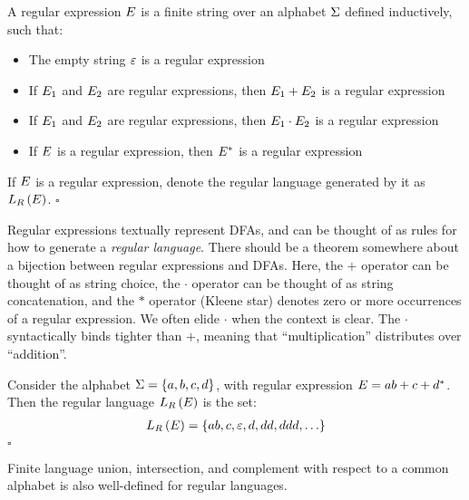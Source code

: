 \begin{definition}
  A regular expression \(E\)
  is a finite string over an alphabet \(\Sigma\)
  defined inductively, such that:
  \begin{itemize}
    \item
      The empty string \(\varepsilon\) is a regular expression

    \item
      If \(E_1\) and \(E_2\) are regular expressions,
      then \(E_1 + E_2\) is a regular expression

    \item
      If \(E_1\) and \(E_2\) are regular expressions,
      then \(E_1 \cdot E_2\) is a regular expression

    \item
      If \(E\) is a regular expression,
      then \(E^\ast\) is a regular expression
  \end{itemize}
  If \(E\) is a regular expression, denote the 
  regular language generated by it as \(L_{R}\left(E\right)\).
  \hfill\(\square\)
\end{definition}

Regular expressions textually represent DFAs, and can be thought of
as rules for how to generate a \textit{regular language}.
There should be a theorem somewhere about a bijection between
regular expressions and DFAs.
Here, the \(+\) operator can be thought of as string choice,
the \(\cdot\) operator can be thought of as string concatenation,
and the \(\ast\) operator (Kleene star) denotes zero or more occurrences
of a regular expression.
We often elide \(\cdot\) when the context is clear.
The \(\cdot\) syntactically
binds tighter than \(+\), meaning that ``multiplication''
distributes over ``addition''.

\begin{example}
  Consider the alphabet \(\Sigma = \left\{a, b, c, d\right\}\),
  with regular expression \(E = ab + c + d^\ast\).
  Then the regular language \(L_{R}\left(E\right)\) is the set:
  \begin{align*}
    L_{R}\left(E\right) =
      \left\{ab, c, \varepsilon, d, dd, ddd, \ldots\right\}
  \end{align*}
  \hfill\(\square\)
\end{example}

Finite language union, intersection, and complement
with respect to a common alphabet
is also well-defined for regular languages.

